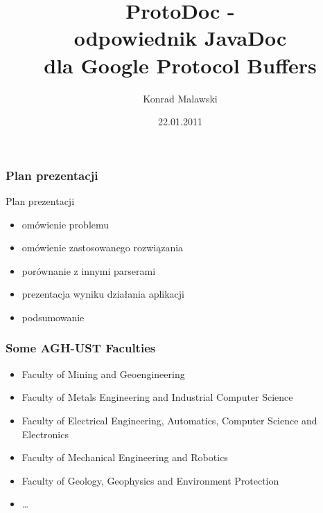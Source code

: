 \documentclass{beamer}
\title[ProtoDoc - odpowiednik JavaDoc dla Google Protocol Buffers]{ProtoDoc - \\ odpowiednik JavaDoc\\ dla Google Protocol Buffers}
\author[K. Malawski]{Konrad Malawski}
\date[2011]{22.01.2011}
\institute[AGH-UST]
{Faculty of EEACSE\\ 
Department of Automatics
}
\begin{document}


{
 \begin{frame}
   \titlepage
 \end{frame}
}



\begin{frame}
\frametitle{Plan prezentacji}
 \begin{block}{Plan prezentacji}
  \begin{itemize}
   \item omówienie problemu
   \item omówienie zastosowanego rozwiązania
   \item porównanie z innymi parserami
   \item prezentacja wyniku działania aplikacji
   \item podsumowanie
  \end{itemize}
 \end{block}
\end{frame}



\begin{frame}
\frametitle{Some AGH-UST Faculties}

\begin{itemize}
\item Faculty of Mining and Geoengineering
\item Faculty of Metals Engineering and Industrial Computer Science
\item Faculty of Electrical Engineering, Automatics, Computer Science and Electronics
\item Faculty of Mechanical Engineering and Robotics
\item Faculty of Geology, Geophysics and Environment Protection
\item \dots
\end{itemize}

\end{frame}
\end{document}

